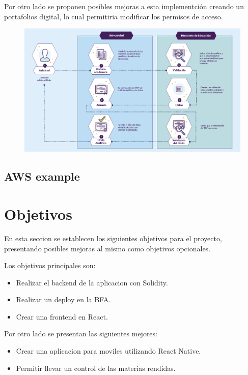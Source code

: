 \documentclass[11pt,a4paper]{article}
\begin{document}
        Por otro lado se proponen posibles mejoras a esta implementción creando un portafolios digital, lo cual 
        permitiria modificar los permisos de acceso.

        \begin{figure}
            \centering
            \includegraphics[width=\textwidth]{Img/cuadro_problematica.png}
            \caption{}
            \label{fig:cuadro_problematica}
        \end{figure}

        \subsection{AWS example}
    \section{Objetivos}

        En esta seccion se establecen los siguientes objetivos para el proyecto, 
        presentando posibles mejoras al mismo como objetivos opcionales.

        Los objetivos principales son:

        \begin{itemize}
            \item Realizar el backend de la aplicacion con Solidity.
            \item Realizar un deploy en la BFA.
            \item Crear una frontend en React.
        \end{itemize}

        Por otro lado se presentan las siguientes mejores:

        \begin{itemize}
            \item Crear una aplicacion para moviles utilizando React Native.
            \item Permitir llevar un control de las materias rendidas.
        \end{itemize}
\end{document}
